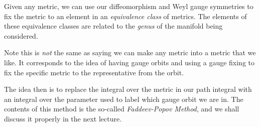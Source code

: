 \bcl 
Given any metric, we can use our diffeomorphism and Weyl gauge symmetries to fix the metric to an element in an \textit{equivalence class} of metrics. The elements of these equivalence classes are related to the \textit{genus} of the manifold being considered. 
\ecl 

\br 
Note this is \textit{not} the same as saying we can make any metric into a metric that we like. It corresponds to the idea of having gauge orbits and using a gauge fixing to fix the specific metric to the representative from the orbit. 
\er 

The idea then is to replace the integral over the metric in our path integral with an integral over the parameter used to label which gauge orbit we are in. The contents of this method is the so-called \textit{Faddeev-Popov Method}, and we shall discuss it properly in the next lecture. 